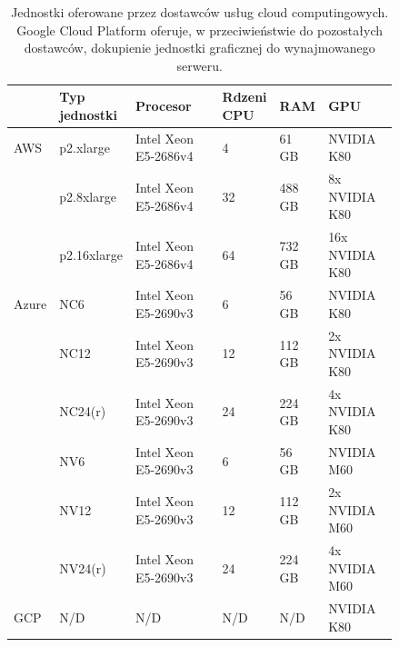 \documentclass[12pt,a4paper,twoside]{article}
\begin{document}
\noindent
\begin{table}
  \begin{tabular}
    {p{0.08\linewidth}
    p{0.15\linewidth}
    p{0.24\linewidth}
    p{0.08\linewidth}
    p{0.10\linewidth}
    p{0.19\linewidth}}
  \toprule
   & Typ jednostki & Procesor & Rdzeni CPU & RAM & GPU \\
  \midrule
  AWS & p2.xlarge & Intel Xeon E5-2686v4 & 4 & 61 GB & NVIDIA K80 \\
      & p2.8xlarge & Intel Xeon E5-2686v4 & 32 & 488 GB & 8x NVIDIA K80 \\
      & p2.16xlarge & Intel Xeon E5-2686v4 & 64 & 732 GB & 16x NVIDIA K80 \\
  \midrule
  Azure & NC6 & Intel Xeon E5-2690v3 & 6 & 56 GB & NVIDIA K80 \\
        & NC12 & Intel Xeon E5-2690v3 & 12 & 112 GB & 2x NVIDIA K80 \\
        & NC24(r) & Intel Xeon E5-2690v3 & 24 & 224 GB & 4x NVIDIA K80 \\
        & NV6 & Intel Xeon E5-2690v3 & 6 & 56 GB & NVIDIA M60 \\
        & NV12 & Intel Xeon E5-2690v3 & 12 & 112 GB & 2x NVIDIA M60 \\
        & NV24(r) & Intel Xeon E5-2690v3 & 24 & 224 GB & 4x NVIDIA M60 \\
  \midrule
  GCP & N/D & N/D & N/D & N/D & NVIDIA K80 \\
  \bottomrule
  \end{tabular}
  \caption{Jednostki oferowane przez dostawców usług cloud computingowych. Google Cloud Platform oferuje, w przeciwieństwie do pozostałych dostawców, dokupienie jednostki graficznej do wynajmowanego serweru.}\label{tab:gpu_units}
\end{table}
\end{document}
